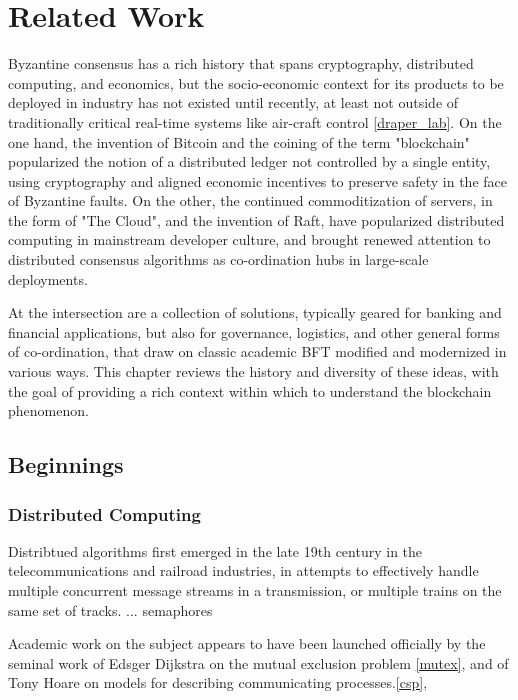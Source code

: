 \chapter{Related Work}
\label{ch:related}

Byzantine consensus has a rich history that spans cryptography, distributed computing, and economics,
but the socio-economic context for its products to be deployed in industry has not existed until recently,
at least not outside of traditionally critical real-time systems like air-craft control \ref{draper_lab}.
On the one hand, the invention of Bitcoin and the coining of the term "blockchain" popularized the notion
of a distributed ledger not controlled by a single entity, using cryptography and aligned economic incentives to 
preserve safety in the face of Byzantine faults.
On the other, the continued commoditization of servers, in the form of "The Cloud", and the invention of Raft, 
have popularized distributed computing in mainstream developer culture, 
and brought renewed attention to distributed consensus algorithms as co-ordination hubs in large-scale deployments. 

At the intersection are a collection of solutions, typically geared for banking and financial applications,
but also for governance, logistics, and other general forms of co-ordination, 
that draw on classic academic BFT modified and modernized in various ways.
This chapter reviews the history and diversity of these ideas, with the goal of providing a rich context within which to 
understand the blockchain phenomenon.

\section{Beginnings}

\subsection{Distributed Computing}

Distribtued algorithms first emerged in the late 19th century in the telecommunications and railroad industries,
in attempts to effectively handle multiple concurrent message streams in a transmission, 
or multiple trains on the same set of tracks. ... semaphores

Academic work on the subject appears to have been launched officially by the seminal work
of Edsger Dijkstra on the mutual exclusion problem \ref{mutex}, and of Tony Hoare on models for describing communicating processes.\ref{csp}, 


